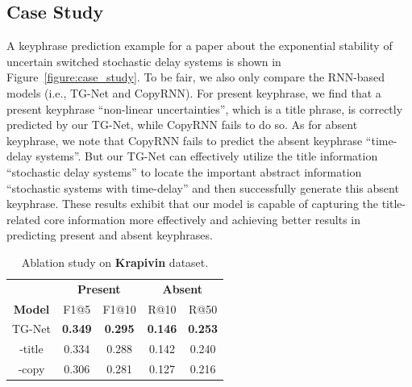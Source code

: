 \documentclass[letterpaper]{article} %
\begin{document}
\subsection{Case Study}
\vspace{-0.72mm}
\vspace{-1.45mm}
A keyphrase prediction example for a paper about the exponential stability of uncertain switched stochastic delay systems is shown in Figure~\ref{figure:case_study}. To be fair, we also only compare the RNN-based models (i.e., TG-Net and CopyRNN). For present keyphrase, we find that a present keyphrase ``non-linear uncertainties'', which is a title phrase, is correctly predicted by our TG-Net, while CopyRNN fails to do so. As for absent keyphrase, we note that CopyRNN fails to predict the absent keyphrase ``time-delay systems''. But our TG-Net can effectively utilize the title information ``stochastic delay systems'' to locate the important abstract information ``stochastic systems with time-delay'' and then successfully generate this absent keyphrase. These results exhibit that our model is capable of capturing the title-related core information more effectively and achieving better results in predicting present and absent keyphrases.


\begin{table}[t]
\centering
\begin{tabular}{c| c c| c c}
\hline
\hline
& \multicolumn{2}{c|}{\textbf{Present}} & \multicolumn{2}{c}{\textbf{Absent}}
\\
\textbf{Model} & F1@5 & F1@10 & R@10 & R@50
\\
\hline
\hline
TG-Net & \textbf{0.349} & \textbf{0.295} & \textbf{0.146} & \textbf{0.253}\\
\hline
-title & 0.334 & 0.288 & 0.142 & 0.240\\
\hline
-copy & 0.306 & 0.281 & 0.127 & 0.216\\
\hline
\end{tabular}
\vspace{-0.72mm}
\caption{Ablation study on \textbf{Krapivin} dataset.}
\label{table:ablation study}
\end{table}
\end{document}
